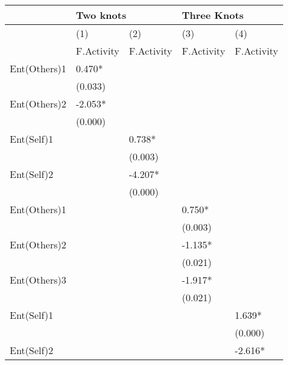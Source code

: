 \begin{table}[]
\centering
\begin{tabular}{@{}lllll@{}}
\toprule
              & \multicolumn{2}{l}{Two knots} & \multicolumn{2}{l}{Three Knots} \\ \midrule
              & (1)           & (2)           & (3)            & (4)            \\
              & F.Activity    & F.Activity    & F.Activity     & F.Activity     \\
Ent(Others)1  & 0.470*        &               &                &                \\
              & (0.033)       &               &                &                \\
Ent(Others)2  & -2.053*       &               &                &                \\
              & (0.000)       &               &                &                \\
Ent(Self)1    &               & 0.738*        &                &                \\
              &               & (0.003)       &                &                \\
Ent(Self)2    &               & -4.207*       &                &                \\
              &               & (0.000)       &                &                \\
Ent(Others)1  &               &               & 0.750*         &                \\
              &               &               & (0.003)        &                \\
Ent(Others)2  &               &               & -1.135*        &                \\
              &               &               & (0.021)        &                \\
Ent(Others)3  &               &               & -1.917*        &                \\
              &               &               & (0.021)        &                \\
Ent(Self)1    &               &               &                & 1.639*         \\
              &               &               &                & (0.000)        \\
Ent(Self)2    &               &               &                & -2.616*        \\

\end{tabular}
\end{table}
